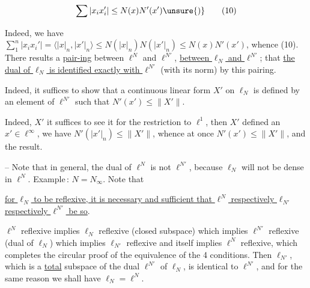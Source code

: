 
\[
\sum|x_i x_i'|\leq N(x)N'(x')\unsure{)}\tag*{(10)}
\]

Indeed, we have $\sum_{1}^{n}|x_i x_i'|=\langle |x|_n,|x'|_n\rangle\leq N(|x|_n)N(|x'|_n)\leq N(x)N'(x')$\unsure{)}, whence (10). There results a \uline{pair-}\newline\uline{ing} between $\ell^N$ and $\ell^{N'}$,   \uline{between $\ell_N$ and $\ell^{N'}$};   that \uline{the dual of $\ell_N$ is identified exactly with $\ell^{N'}$} (with its norm) by this pairing.


Indeed,  it suffices to show that a continuous linear form $X'$ on $\ell_N$ is defined by an  element of $\ell^{N'}$  such that $N'(x')\leq\lVert X'\rVert$.

Indeed, $X'$  it suffices to see it for the  restriction to $\ell^1$, then $X'$  defined   an $x'\in\ell^\infty$,  we have $N'(|x'|_n)\leq\lVert X'\rVert$, whence at once $N'(x')\leq\lVert X'\rVert$, and the result.

-- Note that in general, the dual of $\ell^N$ is not $\ell^{N'}$,  because $\ell_N$ will not be dense in $\ell^N$. Example\,: $N=N_\infty$. Note that

\uline{for $\ell_N$ to be reflexive, it is necessary and sufficient that $\ell^N$ respectively $\ell_{N'}$ respectively $\ell^{N'}$ be so}.  

$\ell^N$ reflexive implies $\ell_N$ reflexive (closed subspace) which implies $\ell^{N'}$ reflexive (dual of $\ell_N$) which  implies $\ell_{N'}$ reflexive and itself implies $\ell^N$ reflexive, which completes the circular proof  of the equivalence of the 4 conditions. Then $\ell_{N'}$, which is a  \uline{total}  subspace of the dual $\ell^{N'}$ of $\ell_N$, is identical to $\ell^{N'}$, and for the same reason we shall have $\ell_N=\ell^N$.


